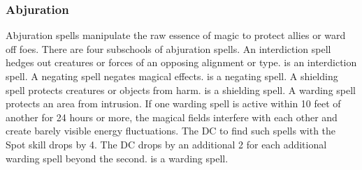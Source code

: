 \subsubsection{Abjuration}
Abjuration spells manipulate the raw essence of magic to protect allies or ward off foes. There are four subschools of abjuration spells.
 An interdiction spell hedges out creatures or forces of an opposing alignment or type.  is an interdiction spell.
 A negating spell negates magical effects.  is a negating spell.
 A shielding spell protects creatures or objects from harm.  is a shielding spell.
 A warding spell protects an area from intrusion. If one warding spell is active within 10 feet of another for 24 hours or more, the magical fields interfere with each other and create barely visible energy fluctuations. The DC to find such spells with the Spot skill drops by 4. The DC drops by an additional 2 for each additional warding spell beyond the second.  is a warding spell.

